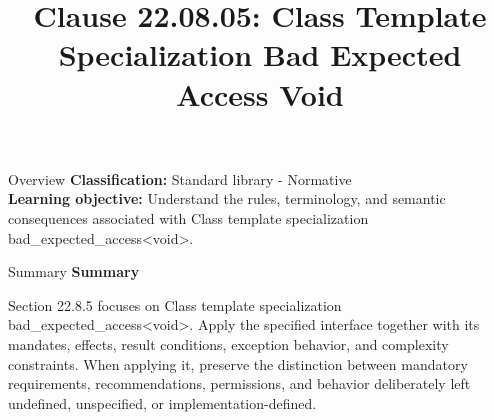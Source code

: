 \documentclass[10pt,letterpaper]{article}
\title{Clause 22.08.05: Class Template Specialization Bad Expected Access Void}
\author{}
\date{}
\begin{document}
\maketitle
\begin{CornellOverviewBox}{Overview}
\textbf{Classification:} Standard library - Normative\\[2pt]
\textbf{Learning objective:} Understand the rules, terminology, and semantic consequences associated with Class template specialization bad\_expected\_access<void>.
\end{CornellOverviewBox}\begin{CornellSummaryBox}{Summary}
{\sffamily\bfseries\color{Accent} Summary}\par\vspace{3pt}Section 22.8.5 focuses on Class template specialization bad\_expected\_access<void>. Apply the specified interface together with its mandates, effects, result conditions, exception behavior, and complexity constraints. When applying it, preserve the distinction between mandatory requirements, recommendations, permissions, and behavior deliberately left undefined, unspecified, or implementation-defined.
\end{CornellSummaryBox}
\end{document}
